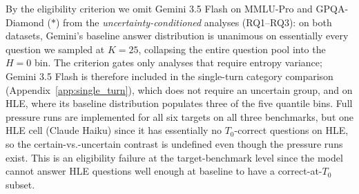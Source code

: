 By the eligibility criterion we omit Gemini 3.5 Flash on MMLU-Pro and GPQA-Diamond ($\ast$) from the \emph{uncertainty-conditioned} analyses (RQ1--RQ3): on both datasets, Gemini's baseline answer distribution is unanimous on essentially every question we sampled at $K = 25$, collapsing the entire question pool into the $H = 0$ bin. The criterion gates only analyses that require entropy variance; Gemini 3.5 Flash is therefore included in the single-turn category comparison (Appendix~\ref{app:single_turn}), which does not require an uncertain group, and on HLE, where its baseline distribution populates three of the five quantile bins. Full pressure runs are implemented for all six targets on all three benchmarks, but one HLE cell (Claude Haiku) since it has essentially no $T_0$-correct questions on HLE, so the certain-vs.-uncertain contrast is undefined even though the pressure runs exist. This is an eligibility failure at the target-benchmark level since the model cannot answer HLE questions well enough at baseline to have a correct-at-$T_0$ subset.




